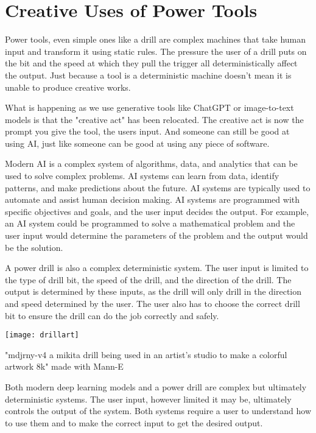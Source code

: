 \section{Creative Uses of Power Tools}

Power tools, even simple ones like a drill are complex machines that take human input and transform it using static rules. The pressure the user of a drill puts on the bit and the speed at which they pull the trigger all deterministically affect the output. Just because a tool is a deterministic machine doesn't mean it is unable to produce creative works.

What is happening as we use generative tools like ChatGPT or image-to-text models is that the "creative act" has been relocated. The creative act is now the prompt you give the tool, the users input. And someone can still be good at using AI, just like someone can be good at using any piece of software.

Modern AI is a complex system of algorithms, data, and analytics that can be used to solve complex problems. AI systems can learn from data, identify patterns, and make predictions about the future. AI systems are typically used to automate and assist human decision making. AI systems are programmed with specific objectives and goals, and the user input decides the output. For example, an AI system could be programmed to solve a mathematical problem and the user input would determine the parameters of the problem and the output would be the solution.

A power drill is also a complex deterministic system. The user input is limited to the type of drill bit, the speed of the drill, and the direction of the drill. The output is determined by these inputs, as the drill will only drill in the direction and speed determined by the user. The user also has to choose the correct drill bit to ensure the drill can do the job correctly and safely.

\begin{marginfigure}[-5.5cm]
        \texttt{[image: drillart]}
        \caption{"mdjrny-v4 a mikita drill being used in an artist's studio to make a colorful artwork 8k" made with Mann-E}
\end{marginfigure}

Both modern deep learning models and a power drill are complex but ultimately deterministic systems. The user input, however limited it may be, ultimately controls the output of the system. Both systems require a user to understand how to use them and to make the correct input to get the desired output.

